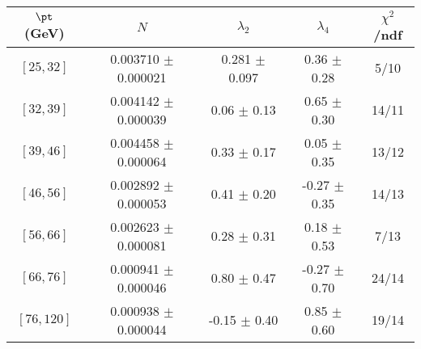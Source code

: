 \begin{tabular}{c||c|c|c|c}
$\pt$ (GeV) & $N$ & $\lambda_{2}$ & $\lambda_4$  & $\chi^2$/ndf  \\
\hline
$[25, 32]$ & 0.003710 $\pm$ 0.000021 & 0.281 $\pm$ 0.097 & 0.36 $\pm$ 0.28 & 5/10\\
$[32, 39]$ & 0.004142 $\pm$ 0.000039 & 0.06 $\pm$ 0.13 & 0.65 $\pm$ 0.30 & 14/11\\
$[39, 46]$ & 0.004458 $\pm$ 0.000064 & 0.33 $\pm$ 0.17 & 0.05 $\pm$ 0.35 & 13/12\\
$[46, 56]$ & 0.002892 $\pm$ 0.000053 & 0.41 $\pm$ 0.20 & -0.27 $\pm$ 0.35 & 14/13\\
$[56, 66]$ & 0.002623 $\pm$ 0.000081 & 0.28 $\pm$ 0.31 & 0.18 $\pm$ 0.53 & 7/13\\
$[66, 76]$ & 0.000941 $\pm$ 0.000046 & 0.80 $\pm$ 0.47 & -0.27 $\pm$ 0.70 & 24/14\\
$[76, 120]$ & 0.000938 $\pm$ 0.000044 & -0.15 $\pm$ 0.40 & 0.85 $\pm$ 0.60 & 19/14\\
\end{tabular}
